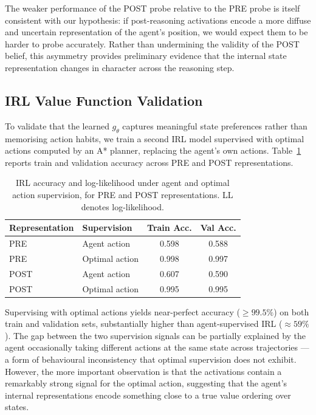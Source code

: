 \documentclass[final]{sparreport}
\begin{document}
The weaker performance of the POST probe relative to the PRE probe is itself 
consistent with our hypothesis: if post-reasoning activations encode a more 
diffuse and uncertain representation of the agent's position, we would expect 
them to be harder to probe accurately. Rather than undermining the validity of 
the POST belief, this asymmetry provides preliminary evidence that the internal 
state representation changes in character across the reasoning step.

\subsection{IRL Value Function Validation}

To validate that the learned $g_\theta$ captures meaningful state preferences 
rather than memorising action habits, we train a second IRL model supervised 
with optimal actions computed by an A* planner, replacing the agent's own actions. 
Table~\ref{tab:irl_comparison} reports train and validation accuracy across PRE and POST representations.

\begin{table}[h]
\centering
\begin{tabular}{llcc}
\toprule
\textbf{Representation} & \textbf{Supervision} & \textbf{Train Acc.} & \textbf{Val Acc.}  \\
\midrule
PRE  & Agent action   & 0.598 & 0.588  \\
PRE  & Optimal action & 0.998 & 0.997  \\
POST & Agent action   & 0.607 & 0.590  \\
POST & Optimal action & 0.995 & 0.995  \\
\bottomrule
\end{tabular}
\caption{IRL accuracy and log-likelihood under agent and optimal action 
supervision, for PRE and POST representations. LL denotes log-likelihood.}
\label{tab:irl_comparison}
\end{table}

Supervising with optimal actions yields near-perfect accuracy ($\geq 99.5\%$) 
on both train and validation sets, substantially higher than agent-supervised 
IRL ($\approx 59\%$). The gap between the two supervision signals can be 
partially explained by the agent occasionally taking different actions at the 
same state across trajectories — a form of behavioural inconsistency that 
optimal supervision does not exhibit. However, the more important observation 
is that the activations contain a remarkably strong signal for the optimal 
action, suggesting that the agent's internal representations encode something 
close to a true value ordering over states.
\end{document}
